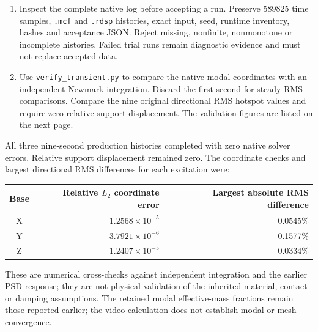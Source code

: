 \begin{enumerate}
\item Inspect the complete native log before accepting a run. Preserve 589825 time samples, \texttt{.mcf} and \texttt{.rdsp} histories, exact input, seed, runtime inventory, hashes and acceptance JSON. Reject missing, nonfinite, nonmonotone or incomplete histories. Failed trial runs remain diagnostic evidence and must not replace accepted data.
\item Use \texttt{verify\_transient.py} to compare the native modal coordinates with an independent Newmark integration. Discard the first second for steady RMS comparisons. Compare the nine original directional RMS hotspot values and require zero relative support displacement. The validation figures are listed on the next page.
\end{enumerate}

All three nine-second production histories completed with zero native solver errors. Relative support displacement remained zero. The coordinate checks and largest directional RMS differences for each excitation were:
\begin{center}\begin{tabular}{c r r}\toprule
Base & Relative $L_2$ coordinate error & Largest absolute RMS difference\\\midrule
X & $1.2568\times10^{-5}$ & 0.0545\%\\
Y & $3.7921\times10^{-6}$ & 0.1577\%\\
Z & $1.2407\times10^{-5}$ & 0.0334\%\\\bottomrule\end{tabular}\end{center}
These are numerical cross-checks against independent integration and the earlier PSD response; they are not physical validation of the inherited material, contact or damping assumptions. The retained modal effective-mass fractions remain those reported earlier; the video calculation does not establish modal or mesh convergence.

